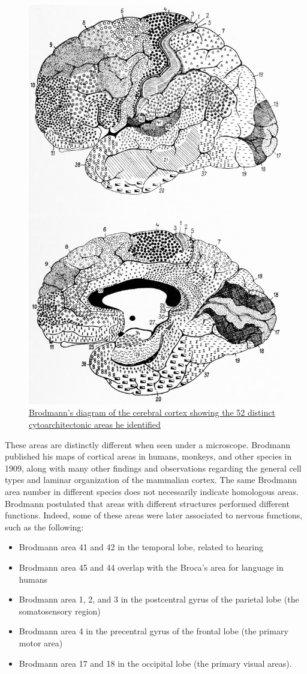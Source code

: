 \begin{figure}

{\centering \includegraphics[width=0.7\linewidth]{./figures/cns/Brodmann_original} 

}

\caption{\href{https://wellcomelibrary.org/item/b28062449}{Brodmann's diagram of the cerebral cortex showing the 52 distinct cytoarchitectonic areas he identified}}\label{fig:brodmannareas}
\end{figure}

These areas are distinctly different when seen under a microscope. Brodmann published his maps of cortical areas in humans, monkeys, and other species in 1909, along with many other findings and observations regarding the general cell types and laminar organization of the mammalian cortex. The same Brodmann area number in different species does not necessarily indicate homologous areas. Brodmann postulated that areas with different structures performed different functions. Indeed, some of these areas were later associated to nervous functions, such as the following:

\begin{itemize}
\tightlist
\item
  Brodmann area 41 and 42 in the temporal lobe, related to hearing
\item
  Brodmann area 45 and 44 overlap with the Broca's area for language in humans
\item
  Brodmann area 1, 2, and 3 in the postcentral gyrus of the parietal lobe (the somatosensory region)
\item
  Brodmann area 4 in the precentral gyrus of the frontal lobe (the primary motor area)
\item
  Brodmann area 17 and 18 in the occipital lobe (the primary visual areas).
\end{itemize}

